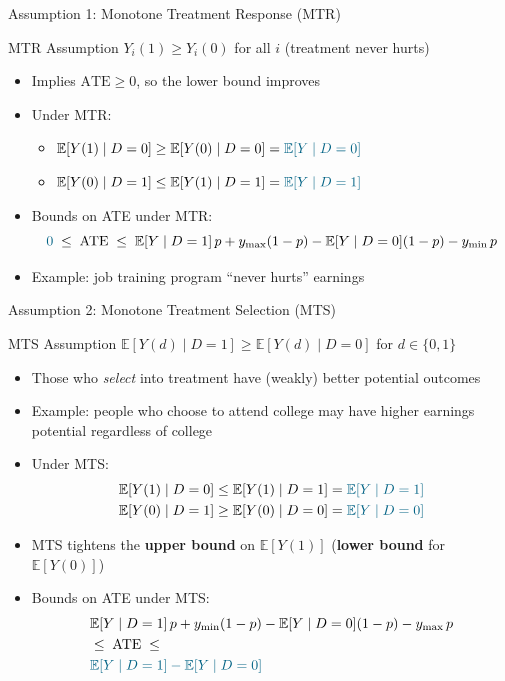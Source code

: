 \documentclass[10pt]{beamer}
\newcommand{\E}{\mathbb{E}}
\begin{document}
\begin{frame}{Assumption 1: Monotone Treatment Response (MTR)}
  \begin{block}{MTR Assumption}
    $Y_i(1) \geq Y_i(0)$ for all $i$ \quad (treatment never hurts)
  \end{block}
  \begin{itemize}
    \item Implies $\text{ATE} \geq 0$, so the lower bound improves
    \item Under MTR:
      \begin{itemize}
        \item $\E[Y(1) \mid D=0] \geq \E[Y(0) \mid D=0] = \textcolor{hanada}{\E[Y \mid D=0]}$
        \item $\E[Y(0) \mid D=1] \leq \E[Y(1) \mid D=1] = \textcolor{hanada}{\E[Y \mid D=1]}$
      \end{itemize}
    \item Bounds on ATE under MTR:
      $$
        \textcolor{hanada}{0} \;\leq\; \text{ATE} \;\leq\; \E[Y \mid D=1]\,p + y_{\max}(1-p) - \E[Y \mid D=0](1-p) - y_{\min}\,p
      $$
    \item Example: job training program ``never hurts'' earnings
  \end{itemize}
\end{frame}

\begin{frame}{Assumption 2: Monotone Treatment Selection (MTS)}
  \begin{block}{MTS Assumption}
    $\E[Y(d) \mid D=1] \geq \E[Y(d) \mid D=0]$ for $d \in \{0,1\}$
  \end{block}
  \begin{itemize}
    \item Those who \textit{select} into treatment have (weakly) better potential outcomes
    \item Example: people who choose to attend college may have higher earnings potential regardless of college
    \item Under MTS:
      \begin{align*}
        \E[Y(1) \mid D=0] \leq \E[Y(1) \mid D=1] =  \textcolor{hanada}{\E[Y \mid D=1]}\\
        \E[Y(0) \mid D=1] \geq \E[Y(0) \mid D=0] = \textcolor{hanada}{\E[Y \mid D=0]}
      \end{align*}
    \item MTS tightens the \textbf{upper bound} on $\E[Y(1)]$ (\textbf{lower bound} for $\E[Y(0)]$)
    \item Bounds on ATE under MTS:
      \begin{align*}
        &\E[Y \mid D=1]\,p + y_{\min}(1-p) - \E[Y \mid D=0](1-p) - y_{\max}\,p\\
        &\leq\; \text{ATE} \;\leq\;\\
        &\textcolor{hanada}{\E[Y \mid D=1] - \E[Y \mid D=0]}
      \end{align*}
  \end{itemize}
\end{frame}
\end{document}
